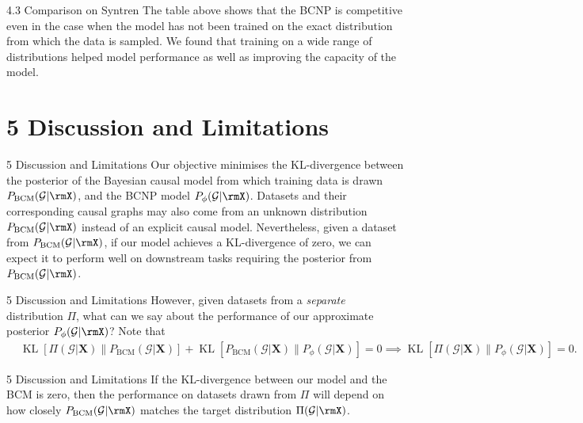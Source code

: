 \documentclass[aspectratio=169,10pt]{beamer}
\begin{document}
\begin{frame}{4.3 Comparison on Syntren}
The table above shows that the BCNP is competitive even in the case when the model has not been trained on the exact distribution from which the data is sampled. We found that training on a wide range of distributions helped model performance as well as improving the capacity of the model.
\end{frame}

\section{5 Discussion and Limitations}

\begin{frame}{5 Discussion and Limitations}
\small
Our objective minimises the KL-divergence between the posterior of the Bayesian causal model from which training data is drawn $P_{\text{BCM}}(\mathcal{G}| \rmX)$, and the BCNP model $P_{\phi}(\mathcal{G}| \rmX)$. Datasets and their corresponding causal graphs may also come from an unknown distribution $P_{\text{BCM}}(\mathcal{G}| \rmX)$ instead of an explicit causal model. Nevertheless, given a dataset from $P_{\text{BCM}}(\mathcal{G}| \rmX)$, if our model achieves a KL-divergence of zero, we can expect it to perform well on downstream tasks requiring the posterior from $P_{\text{BCM}}(\mathcal{G}| \rmX)$.
\end{frame}

\begin{frame}{5 Discussion and Limitations}
\small
However, given datasets from a \textit{separate} distribution $\Pi$, what can we say about the performance of our approximate posterior $P_{\phi}(\mathcal{G}| \rmX)$? Note that
\begin{align*}
    &\operatorname{KL}[
    \Pi(\mathcal{G}| \mathbf{X} ) \| P_{\text{BCM}}(\mathcal{G}| \mathbf{X} )] + \operatorname{KL}[
    P_{\text{BCM}}(\mathcal{G}| \mathbf{X} ) \| P_{\phi}(\mathcal{G}| \mathbf{X} )]
     = 0  \implies
    \operatorname{KL}[
    \Pi(\mathcal{G}| \mathbf{X} ) \| P_{\phi}(\mathcal{G}| \mathbf{X} )]
     = 0 \nonumber.
\end{align*}
\end{frame}

\begin{frame}{5 Discussion and Limitations}
If the KL-divergence between our model and the BCM is zero, then the performance on datasets drawn from $\Pi$ will depend on how closely $P_{\text{BCM}}(\mathcal{G}| \rmX)$ matches the target distribution $\Pi(\mathcal{G}| \rmX)$.
\end{frame}
\end{document}
